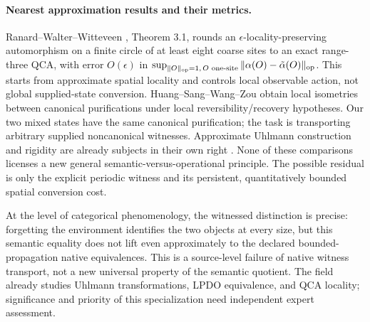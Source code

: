 \documentclass[11pt]{article}
\begin{document}
\paragraph{Nearest approximation results and their metrics.}
Ranard--Walter--Witteveen \cite{ApproxQCA}, Theorem 3.1, rounds an $\epsilon$-locality-preserving automorphism on a finite circle of at least eight coarse sites to an exact range-three QCA, with error $O(\epsilon)$ in
$\sup_{\|O\|_{\rm op}=1,\,O\text{ one-site}}\|\alpha(O)-\tilde\alpha(O)\|_{\rm op}$.
This starts from approximate spatial locality and controls local observable action, not global supplied-state conversion. Huang--Sang--Wang--Zou \cite{Canonical} obtain local isometries between canonical purifications under local reversibility/recovery hypotheses. Our two mixed states have the same canonical purification; the task is transporting arbitrary supplied noncanonical witnesses. Approximate Uhlmann construction and rigidity are already subjects in their own right \cite{Algorithms,Rigidity}. None of these comparisons licenses a new general semantic-versus-operational principle. The possible residual is only the explicit periodic witness and its persistent, quantitatively bounded spatial conversion cost.

At the level of categorical phenomenology, the witnessed distinction is precise: forgetting the environment identifies the two objects at every size, but this semantic equality does not lift even approximately to the declared bounded-propagation native equivalences. This is a source-level failure of native witness transport, not a new universal property of the semantic quotient. The field already studies Uhlmann transformations, LPDO equivalence, and QCA locality; significance and priority of this specialization need independent expert assessment.
\end{document}

